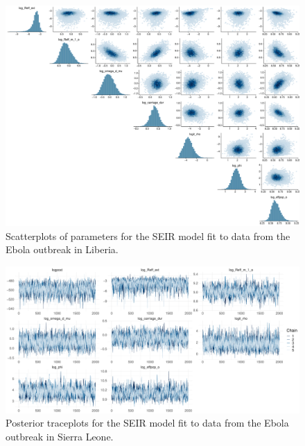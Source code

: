 \begin{figure}[htbp]
	\centering
	\includegraphics[width=\linewidth]{figures/lib_tight_pairs}
	\caption{Scatterplots of parameters for the SEIR model fit to data from the Ebola outbreak in Liberia.}
	\label{fig:liberiapairs}
\end{figure}

\begin{figure}
	\centering
	\includegraphics[width=\linewidth]{figures/sln_tight_traces}
	\caption{Posterior traceplots for the SEIR model fit to data from the Ebola outbreak in Sierra Leone.}
	\label{fig:sierraleonetraces}
\end{figure}

